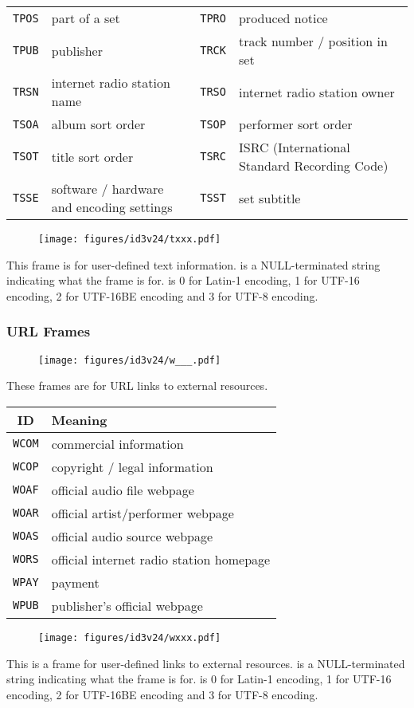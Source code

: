 \begin{table}[h]
{\begin{tabular}{|c|l||c|l|}
\texttt{TPOS} & part of a set &
\texttt{TPRO} & produced notice \\
\texttt{TPUB} & publisher &
\texttt{TRCK} & track number / position in set \\
\texttt{TRSN} & internet radio station name &
\texttt{TRSO} & internet radio station owner \\
\texttt{TSOA} & album sort order &
\texttt{TSOP} & performer sort order \\
\texttt{TSOT} & title sort order &
\texttt{TSRC} & ISRC (International Standard Recording Code) \\
\texttt{TSSE} & software / hardware and encoding settings &
\texttt{TSST} & set subtitle \\
\hline
\end{tabular}
}
\end{table}

\clearpage

\begin{figure}[h]
\texttt{[image: figures/id3v24/txxx.pdf]}
\end{figure}
This frame is for user-defined text information.
 is a NULL-terminated string indicating
what the frame is for.
 is 0 for Latin-1 encoding, 1 for UTF-16 encoding,
2 for UTF-16BE encoding and 3 for UTF-8 encoding.

\subsubsection{URL Frames}
\begin{figure}[h]
\texttt{[image: figures/id3v24/w\_\_\_.pdf]}
\end{figure}
These frames are for URL links to external resources.
\par
\begin{table}[h]
\begin{tabular}{|c|l|}
\hline
ID & Meaning \\
\hline
\texttt{WCOM} & commercial information \\
\texttt{WCOP} & copyright / legal information \\
\texttt{WOAF} & official audio file webpage \\
\texttt{WOAR} & official artist/performer webpage \\
\texttt{WOAS} & official audio source webpage \\
\texttt{WORS} & official internet radio station homepage \\
\texttt{WPAY} & payment \\
\texttt{WPUB} & publisher's official webpage \\
\hline
\end{tabular}
\end{table}

\clearpage

\begin{figure}[h]
\texttt{[image: figures/id3v24/wxxx.pdf]}
\end{figure}
This is a frame for user-defined links to external resources.
 is a NULL-terminated string indicating
what the frame is for.
 is 0 for Latin-1 encoding, 1 for UTF-16 encoding,
2 for UTF-16BE encoding and 3 for UTF-8 encoding.

